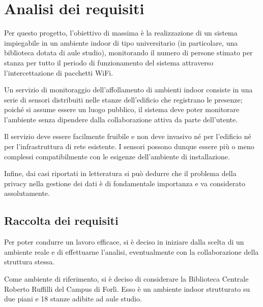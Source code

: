 \section{Analisi dei requisiti}



Per questo progetto, l'obiettivo di massima è la realizzazione di un sistema impiegabile in un ambiente indoor di tipo universitario (in particolare, una biblioteca dotata di aule studio),
monitorando il numero di persone stimato per stanza per tutto il periodo di funzionamento del sistema attraverso l'intercettazione di pacchetti WiFi.

Un servizio di monitoraggio dell'affollamento di ambienti indoor consiste in una serie di sensori distribuiti nelle stanze dell'edificio che registrano le presenze;
poiché si assume essere un luogo pubblico, il sistema deve poter monitorare l'ambiente senza dipendere dalla collaborazione attiva da parte dell'utente.

Il servizio deve essere facilmente fruibile e non deve invasivo né per l'edificio né per l'infrastruttura di rete esistente.
I sensori possono dunque essere più o meno complessi compatibilmente con le esigenze dell'ambiente di installazione.

Infine, dai casi riportati in letteratura si può dedurre che il problema della privacy nella gestione dei dati è di fondamentale importanza e va considerato assolutamente.

\subsection{Raccolta dei requisiti}

Per poter condurre un lavoro efficace, si è deciso in iniziare dalla scelta di un ambiente reale e di effettuarne l'analisi, eventualmente con la collaborazione della struttura stessa.

Come ambiente di riferimento, si è deciso di considerare la Biblioteca Centrale Roberto Ruffilli del Campus di Forlì.
Esso è un ambiente indoor strutturato su due piani e 18 stanze adibite ad aule studio.

